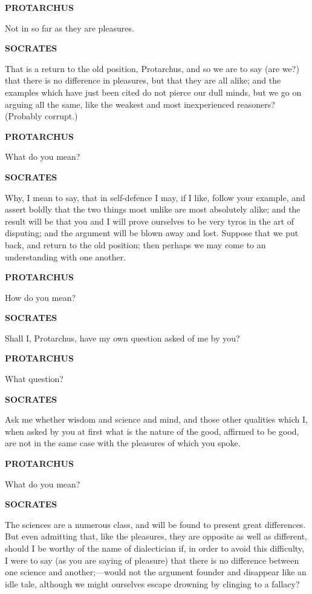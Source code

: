 \documentclass[11pt,letter]{article}
\begin{document}
\par \textbf{PROTARCHUS}
\par   Not in so far as they are pleasures.

\par \textbf{SOCRATES}
\par   That is a return to the old position, Protarchus, and so we are to say (are we?) that there is no difference in pleasures, but that they are all alike; and the examples which have just been cited do not pierce our dull minds, but we go on arguing all the same, like the weakest and most inexperienced reasoners? (Probably corrupt.)

\par \textbf{PROTARCHUS}
\par   What do you mean?

\par \textbf{SOCRATES}
\par   Why, I mean to say, that in self-defence I may, if I like, follow your example, and assert boldly that the two things most unlike are most absolutely alike; and the result will be that you and I will prove ourselves to be very tyros in the art of disputing; and the argument will be blown away and lost. Suppose that we put back, and return to the old position; then perhaps we may come to an understanding with one another.

\par \textbf{PROTARCHUS}
\par   How do you mean?

\par \textbf{SOCRATES}
\par   Shall I, Protarchus, have my own question asked of me by you?

\par \textbf{PROTARCHUS}
\par   What question?

\par \textbf{SOCRATES}
\par   Ask me whether wisdom and science and mind, and those other qualities which I, when asked by you at first what is the nature of the good, affirmed to be good, are not in the same case with the pleasures of which you spoke.

\par \textbf{PROTARCHUS}
\par   What do you mean?

\par \textbf{SOCRATES}
\par   The sciences are a numerous class, and will be found to present great differences. But even admitting that, like the pleasures, they are opposite as well as different, should I be worthy of the name of dialectician if, in order to avoid this difficulty, I were to say (as you are saying of pleasure) that there is no difference between one science and another;—would not the argument founder and disappear like an idle tale, although we might ourselves escape drowning by clinging to a fallacy?
\end{document}
